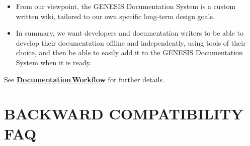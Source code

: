 \documentclass[12pt]{article}
\begin{document}
\begin{enumerate}
\begin{itemize}
\item From our viewpoint, the GENESIS Documentation System is a custom
written wiki, tailored to our own specific long-term design goals.

\item In summary, we want developers and documentation writers to be able to develop their documentation offline and independently,
using tools of their choice, and then be able to easily add it to the GENESIS Documentation System when it is ready.

\end{itemize}

See \href{../workflow-documentation/workflow-documentation.tex}{\bf Documentation\,Workflow} for further details.

\end{enumerate}

\section*{BACKWARD COMPATIBILITY FAQ}



\end{document}
